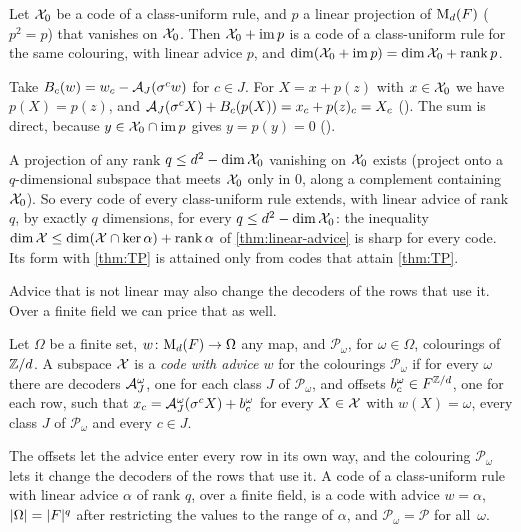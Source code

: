 \begin{proposition}\label{prop:sharp}
Let $\mathcal{X}_0$ be a code of a class-uniform rule, and $p$ a linear projection of $\mathrm{M}_d(F)$ ($p^2=p$) that vanishes on
$\mathcal{X}_0$. Then $\mathcal{X}_0+\operatorname{im} p$ is a code of a class-uniform rule for the same colouring, with linear advice $p$, and
$\dim(\mathcal{X}_0+\operatorname{im} p)=\dim\mathcal{X}_0+\operatorname{rank} p$.
\end{proposition}

\begin{outline}
Take $B_c(w)=w_c-\mathcal{A}_J(\sigma^cw)$ for $c\in J$. For $X=x+p(z)$ with $x\in\mathcal{X}_0$ we have $p(X)=p(z)$, and
$\mathcal{A}_J(\sigma^cX)+B_c(p(X))=x_c+p(z)_c=X_c$ (). The sum is direct, because
$y\in\mathcal{X}_0\cap\operatorname{im} p$ gives $y=p(y)=0$ ().
\end{outline}

A projection of any rank $q\le d^2-\dim\mathcal{X}_0$ vanishing on $\mathcal{X}_0$ exists (project onto a $q$-dimensional subspace that
meets $\mathcal{X}_0$ only in $0$, along a complement containing $\mathcal{X}_0$). So every code of every class-uniform rule extends, with
linear advice of rank $q$, by exactly $q$ dimensions, for every $q\le d^2-\dim\mathcal{X}_0$: the inequality
$\dim\mathcal{X}\le\dim(\mathcal{X}\cap\ker\alpha)+\operatorname{rank}\alpha$ of \cref{thm:linear-advice} is sharp for every code. Its form with
\cref{thm:TP} is attained only from codes that attain \cref{thm:TP}.

Advice that is not linear may also change the decoders of the rows that use it. Over a finite field we can price that
as well.

\begin{definition}\label{def:any-advice}
Let $\Omega$ be a finite set, $w\colon\mathrm{M}_d(F)\to\Omega$ any map, and $\mathcal P_\omega$, for $\omega\in\Omega$,
colourings of $\mathbb{Z}/d$. A subspace $\mathcal{X}$ is a \emph{code with advice $w$} for the colourings $\mathcal P_\omega$ if for every
$\omega$ there are decoders $\mathcal{A}^\omega_J$, one for each class $J$ of $\mathcal P_\omega$, and offsets
$b^\omega_c\in F^{\mathbb{Z}/d}$, one for each row, such that $x_c=\mathcal{A}^\omega_J(\sigma^cX)+b^\omega_c$ for every $X\in\mathcal{X}$ with
$w(X)=\omega$, every class $J$ of $\mathcal P_\omega$ and every $c\in J$.
\end{definition}

The offsets let the advice enter every row in its own way, and the colouring $\mathcal P_\omega$ lets it change the
decoders of the rows that use it. A code of a class-uniform rule with linear advice $\alpha$ of rank $q$, over a finite
field, is a code with advice $w=\alpha$, $\lvert \Omega \rvert=\lvert F \rvert^q$ after restricting the values to the range of $\alpha$,
and $\mathcal P_\omega=\mathcal P$ for all~$\omega$.

